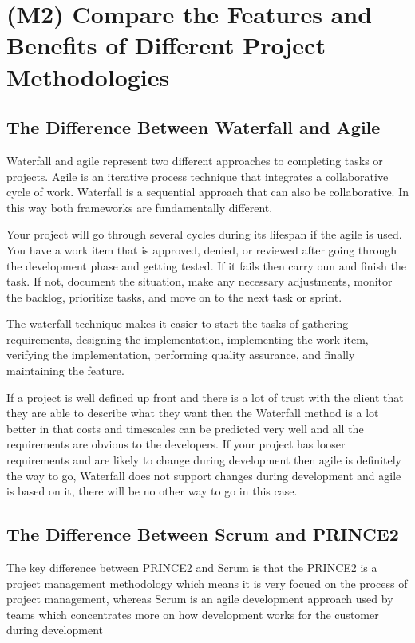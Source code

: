 \documentclass{article}
\begin{document}
\section{(M2) Compare the Features and Benefits of Different Project Methodologies}

\subsection{The Difference Between Waterfall and Agile}
Waterfall and agile represent two different approaches to completing tasks or projects. 
Agile is an iterative process technique that integrates a collaborative cycle of work. Waterfall is a sequential approach that can also be collaborative. In this way both frameworks are fundamentally different.

Your project will go through several cycles during its lifespan if the agile is used. You have a work item that is approved, denied, or reviewed after going through the development phase and getting tested.
If it fails then carry oun and finish the task. If not, document the situation, make any necessary adjustments, monitor the backlog, prioritize tasks, and move on to the next task or sprint.

The waterfall technique makes it easier to start the tasks of gathering requirements, designing the implementation, implementing the work item, verifying the implementation, performing quality assurance, and finally maintaining the feature.

If a project is well defined up front and there is a lot of trust with the client that they are able to describe what they want then the Waterfall method is a lot better in that costs and timescales can be predicted very well and all the requirements are obvious to the developers.
If your project has looser requirements and are likely to change during development then agile is definitely the way to go, Waterfall does not support changes during development and agile is based on it, there will be no other way to go in this case.


\subsection{The Difference Between Scrum and PRINCE2}
The key difference between PRINCE2 and Scrum is that the PRINCE2 is a project management methodology which means it is very focued on the process of project management, whereas Scrum is an agile development approach used by teams which concentrates more on how development works for the customer during development 
\end{document}
